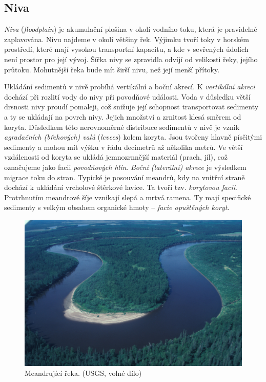 \subsection{Niva}
\emph{Niva} (\textit{floodplain}) je akumulační plošina v okolí vodního toku, která je pravidelně zaplavována. Nivu najdeme v okolí většiny řek. Výjimku tvoří toky v horském prostředí, které mají vysokou transportní kapacitu, a kde v sevřených údolích není prostor pro její vývoj. Šířka nivy se zpravidla odvíjí od velikosti řeky, jejího průtoku. Mohutnější řeka bude mít širší nivu, než její menší přítoky. 

Ukládání sedimentů v nivě probíhá vertikální a boční akrecí. K \emph{vertikální akreci} dochází při rozlití vody do nivy při povodňové události. Voda v důsledku větší drsnosti nivy proudí pomaleji, což snižuje její schopnost transportovat sedimenty a ty se ukládají na povrch nivy. Jejich množství a zrnitost klesá směrem od koryta. Důsledkem této nerovnoměrné distribuce sedimentů v nivě je vznik \emph{agradačních (břehových) valů} (\textit{levees}) kolem koryta. Jsou tvořeny hlavně písčitými sedimenty a mohou mít výšku v řádu decimetrů až několika metrů. Ve větší vzdálenosti od koryta se ukládá jemnozrnnější materiál (prach, jíl), což označujeme jako facii \emph{povodňových hlín}. \emph{Boční (laterální) akrece} je výsledkem migrace toku do stran. Typické je posouvání meandrů, kdy na vnitřní straně dochází k ukládání vrcholové štěrkové lavice. Ta tvoří tzv. \emph{korytovou facii}. Protrhnutím meandrové šíje vznikají slepá a mrtvá ramena. Ty mají specifické sedimenty s velkým obsahem organické hmoty -- \emph{facie opuštěných koryt}.


\begin{figure}[h]
	\centering
	\includegraphics[width=1\linewidth]{obrazky/fluvial/meander}
	\caption{Meandrující řeka. (USGS, volné dílo)}
	\label{fig:meander}
\end{figure}

